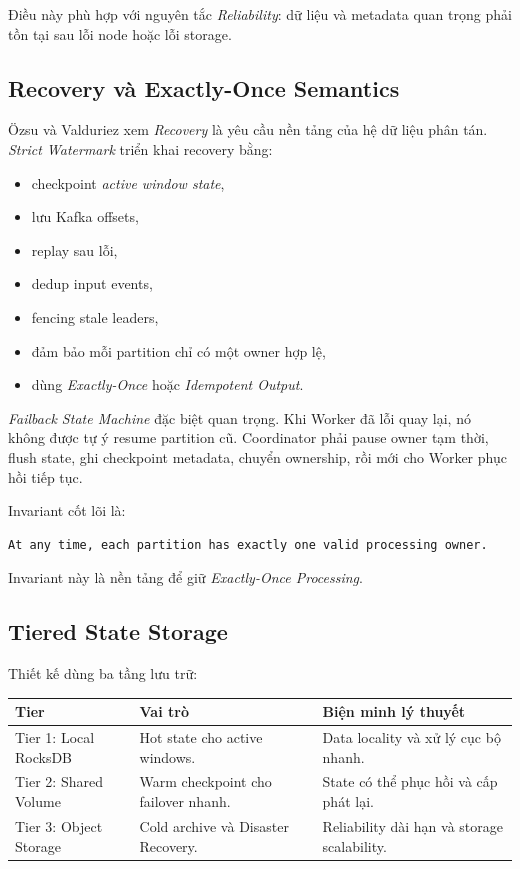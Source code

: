 \documentclass[12pt,a4paper]{article}
\begin{document}
Điều này phù hợp với nguyên tắc \textit{Reliability}: dữ liệu và metadata quan trọng phải tồn tại sau lỗi node hoặc lỗi storage.

\subsection{Recovery và Exactly-Once Semantics}

Özsu và Valduriez xem \textit{Recovery} là yêu cầu nền tảng của hệ dữ liệu phân tán. \textit{Strict Watermark} triển khai recovery bằng:

\begin{itemize}
    \item checkpoint \textit{active window state},
    \item lưu Kafka offsets,
    \item replay sau lỗi,
    \item dedup input events,
    \item fencing stale leaders,
    \item đảm bảo mỗi partition chỉ có một owner hợp lệ,
    \item dùng \textit{Exactly-Once} hoặc \textit{Idempotent Output}.
\end{itemize}

\textit{Failback State Machine} đặc biệt quan trọng. Khi Worker đã lỗi quay lại, nó không được tự ý resume partition cũ. Coordinator phải pause owner tạm thời, flush state, ghi checkpoint metadata, chuyển ownership, rồi mới cho Worker phục hồi tiếp tục.

Invariant cốt lõi là:

\begin{lstlisting}
At any time, each partition has exactly one valid processing owner.
\end{lstlisting}

Invariant này là nền tảng để giữ \textit{Exactly-Once Processing}.

\subsection{Tiered State Storage}

Thiết kế dùng ba tầng lưu trữ:

\begin{longtable}{p{} p{} p{}}
\toprule
\textbf{Tier} & \textbf{Vai trò} & \textbf{Biện minh lý thuyết} \\
\midrule
\endhead
Tier 1: Local RocksDB & Hot state cho active windows. & Data locality và xử lý cục bộ nhanh. \\
Tier 2: Shared Volume & Warm checkpoint cho failover nhanh. & State có thể phục hồi và cấp phát lại. \\
Tier 3: Object Storage & Cold archive và Disaster Recovery. & Reliability dài hạn và storage scalability. \\
\bottomrule
\end{longtable}
\end{document}
